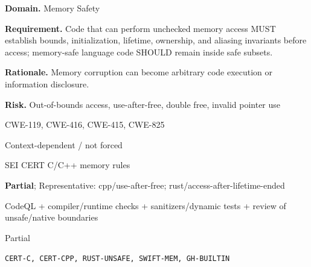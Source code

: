 \documentclass[10pt,letterpaper]{article}
\newcommand{\prioritybadge}[2]{\tcbox[on line,boxrule=0pt,arc=1.2mm,boxsep=0.7mm,left=1mm,right=1mm,top=0.4mm,bottom=0.4mm,colback=#2!12,coltext=#2]{\scriptsize\bfseries #1}}
\begin{document}
\begin{rulebox}[title={\texttt{SCS-ALL-MEM-001} \hfill \prioritybadge{Critical Control}{Critical}}]
\textbf{Domain.} Memory Safety

\textbf{Requirement.} Code that can perform unchecked memory access MUST establish bounds, initialization, lifetime, ownership, and aliasing invariants before access; memory-safe language code SHOULD remain inside safe subsets.

\textbf{Rationale.} Memory corruption can become arbitrary code execution or information disclosure.

\textbf{Risk.} Out-of-bounds access, use-after-free, double free, invalid pointer use

\begin{description}[leftmargin=2.65cm,labelwidth=2.3cm,style=nextline,itemsep=1pt,topsep=3pt]
  \item[CWE] CWE-119, CWE-416, CWE-415, CWE-825
  \item[OWASP] Context-dependent / not forced
  \item[CERT] SEI CERT C/C++ memory rules
  \item[CodeQL] \textbf{Partial}; Representative: cpp/use-after-free; rust/access-after-lifetime-ended
  \item[Enforcement] CodeQL + compiler/runtime checks + sanitizers/dynamic tests + review of unsafe/native boundaries
  \item[Automation] Partial
  \item[Sources] \texttt{CERT-C, CERT-CPP, RUST-UNSAFE, SWIFT-MEM, GH-BUILTIN}
\end{description}
\end{rulebox}
\end{document}

